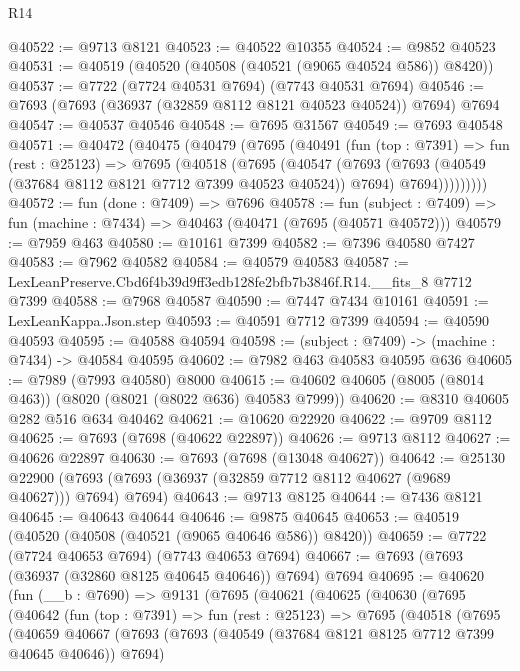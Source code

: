 \begin{lexlean}{R14}
\begin{coremodule}
@40522 := @9713 @8121
@40523 := @40522 @10355
@40524 := @9852 @40523
@40531 := @40519 (@40520 (@40508 (@40521 (@9065 @40524 @586)) @8420))
@40537 := @7722 (@7724 @40531 @7694) (@7743 @40531 @7694)
@40546 := @7693 (@7693 (@36937 (@32859 @8112 @8121 @40523 @40524)) @7694) @7694
@40547 := @40537 @40546
@40548 := @7695 @31567
@40549 := @7693 @40548
@40571 := @40472
    (@40475
      (@40479
        (@7695
          (@40491
            (fun (top : @7391) =>
            fun (rest : @25123) =>
            @7695
              (@40518
                (@7695
                  (@40547
                    (@7693
                      (@7693 (@40549 (@37684 @8112 @8121 @7712 @7399 @40523 @40524)) @7694)
                      @7694)))))))))
@40572 := fun (done : @7409) => @7696
@40578 := fun (subject : @7409) => fun (machine : @7434) => @40463 (@40471 (@7695 (@40571 @40572)))
@40579 := @7959 @463
@40580 := @10161 @7399
@40582 := @7396 @40580 @7427
@40583 := @7962 @40582
@40584 := @40579 @40583
@40587 := LexLeanPreserve.Cbd6f4b39d9ff3edb128fe2bfb7b3846f.R14.__fits_8 @7712 @7399
@40588 := @7968 @40587
@40590 := @7447 @7434 @10161
@40591 := LexLeanKappa.Json.step
@40593 := @40591 @7712 @7399
@40594 := @40590 @40593
@40595 := @40588 @40594
@40598 := (subject : @7409) -> (machine : @7434) -> @40584 @40595
@40602 := @7982 @463 @40583 @40595 @636
@40605 := @7989 (@7993 @40580) @8000
@40615 := @40602 @40605 (@8005 (@8014 @463)) (@8020 (@8021 (@8022 @636) @40583 @7999))
@40620 := @8310 @40605 @282 @516 @634 @40462
@40621 := @10620 @22920
@40622 := @9709 @8112
@40625 := @7693 (@7698 (@40622 @22897))
@40626 := @9713 @8112
@40627 := @40626 @22897
@40630 := @7693 (@7698 (@13048 @40627))
@40642 := @25130
    @22900
    (@7693 (@7693 (@36937 (@32859 @7712 @8112 @40627 (@9689 @40627))) @7694) @7694)
@40643 := @9713 @8125
@40644 := @7436 @8121
@40645 := @40643 @40644
@40646 := @9875 @40645
@40653 := @40519 (@40520 (@40508 (@40521 (@9065 @40646 @586)) @8420))
@40659 := @7722 (@7724 @40653 @7694) (@7743 @40653 @7694)
@40667 := @7693 (@7693 (@36937 (@32860 @8125 @40645 @40646)) @7694) @7694
@40695 := @40620
    (fun (__b : @7690) =>
    @9131
      (@7695
        (@40621
          (@40625
            (@40630
              (@7695
                (@40642
                  (fun (top : @7391) =>
                  fun (rest : @25123) =>
                  @7695
                    (@40518
                      (@7695
                        (@40659
                          @40667
                          (@7693
                            (@7693 (@40549 (@37684 @8121 @8125 @7712 @7399 @40645 @40646)) @7694)

\end{coremodule}
\end{lexlean}
